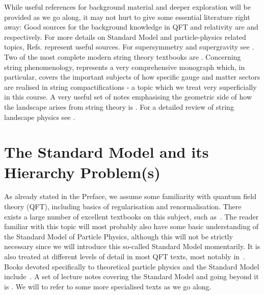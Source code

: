 \documentclass[12pt]{article}
\numberwithin{equation}{section}
\begin{document}
While useful references for background material and deeper exploration will be provided as we go along, it may not hurt to give some essential literature right away: Good sources for the background knowledge in QFT and relativity are \cite{Peskin:1995ev} and \cite{Wald:1984rg} respectively. For more details on Standard Model and particle-physics related topics, Refs. \cite{Cheng:1985bj, Donoghue:1992dd} represent useful sources. For supersymmetry and supergravity see \cite{Wess:1992cp, Freedman:2012zz}. Two of the most complete modern string theory textbooks are \cite{Polchinski:1998rq, Blumenhagen:2013fgp}. Concerning string phenomenology, \cite{Ibanez:2012zz} represents a very comprehensive monograph which, in particular, covers the important subjects of how specific gauge and matter sectors are realised in string compactifications - a topic which we treat very superficially in this course. A very useful set of notes emphasising the geometric side of how the landscape arises from string theory is \cite{Denef:2008wq}. For a detailed review of string landscape physics see \cite{Schellekens:2013bpa}.

\tableofcontents 




\section{The Standard Model and its Hierarchy Problem(s)}
\label{smhp}

As already stated in the Preface, we assume some familiarity with quantum field theory (QFT), including basics of regularisation and renormalisation. There exists a large number of excellent textbooks on this subject, such as~\cite{Peskin:1995ev, Weinberg:1995mt, Itzykson:1980rh, Srednicki:2007qs, Schwartz:2013pla}. The reader familiar with this topic will most probably also have some basic understanding of the Standard Model of Particle Physics, although this will not be strictly necessary since we will introduce this so-called Standard Model momentarily. It is also treated at different levels of detail in most QFT texts, most notably in~\cite{Weinberg:1995mt, Schwartz:2013pla}. Books devoted specifically to theoretical particle physics and the Standard Model include~\cite{Cheng:1985bj, Donoghue:1992dd, Nachtmann:1990ta}. A set of lecture notes covering the Standard Model and going beyond it is \cite{sche}. We will to refer to some more specialised texts as we go along.
\end{document}
